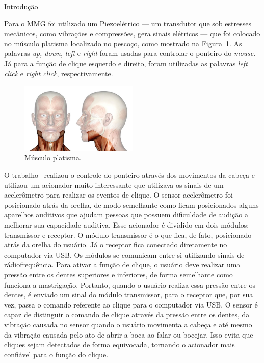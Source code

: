 \begin{chapter}{Introdução}
\begin{figure}[h!]
\end{figure}
Para o MMG foi utilizado um Piezoelétrico --- um transdutor que sob estresses
mecânicos, como vibrações e compressões, gera sinais elétricos --- que foi
colocado no músculo platisma localizado no pescoço, como mostrado na
Figura~\ref{fig:platisma}. As palavras \textit{up, down, left} e \textit{right}
foram usadas para controlar o ponteiro do \textit{mouse}. Já para a função de
clique esquerdo e direito, foram utilizadas as palavras \textit{left click} e
\textit{right click}, respectivamente.
\begin{figure}[!h]
	\centering
	\includegraphics[width=0.5\textwidth]{fig/platisma}
	\caption{Músculo platisma.}
	\label{fig:platisma}
\end{figure}

O trabalho~\cite{Simpson08} realizou o controle do ponteiro através dos
movimentos da cabeça e utilizou um acionador muito interessante que
utilizava os sinais de um acelerômetro para realizar os eventos de clique. O
sensor acelerômetro foi posicionado atrás da orelha, de modo semelhante como
ficam posicionados alguns aparelhos auditivos que ajudam pessoas que possuem
dificuldade de audição a melhorar sua capacidade auditiva. Esse acionador é
dividido em dois módulos: transmissor e receptor. O módulo transmissor é o que
fica, de fato, posicionado atrás da orelha do usuário. Já o receptor fica
conectado diretamente no computador via USB. Os módulos se comunicam entre si
utilizando sinais de rádiofrequência. Para ativar a função de clique, o usuário
deve realizar uma pressão entre os dentes superiores e inferiores, de forma
semelhante como funciona a mastrigação. Portanto, quando o usuário realiza essa
pressão entre os dentes, é enviado um sinal do módulo transmissor, para o
receptor que, por sua vez, passa o comando referente ao clique para o computador
via USB. O sensor é capaz de distinguir o comando de clique através da pressão
entre os dentes, da vibração causada no sensor quando o usuário movimenta a
cabeça e até mesmo da vibração causada pelo ato de abrir a boca ao falar ou
bocejar. Isso evita que cliques sejam detectados de forma equivocada, tornando o
acionador mais confiável para o função do clique.


\end{chapter}
